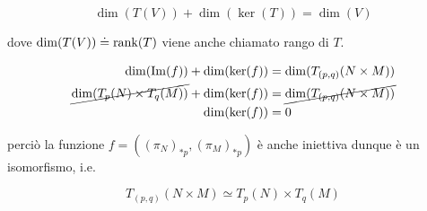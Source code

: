 {{	\begin{equation*}
		\dim(T(V)) + \dim(\ker(T)) = \dim(V)
	\end{equation*}
	
	dove $ \dim(T(V)) \doteq \rank(T) $ viene anche chiamato rango di $ T $.%
}

\begin{align}
	\begin{split}
		\dim(\Im(f)) + \dim(\ker(f)) &= \dim(T_{(p,q)}(N \times M)) \\
		\cancel{ \dim(T_{p}(N) \times T_{q}(M)) } + \dim(\ker(f)) &= \cancel{ \dim(T_{(p,q)}(N \times M)) } \\
		\dim(\ker(f)) &= 0
	\end{split}
\end{align}

perciò la funzione $ f = \left( (\pi_{N})_{*p},(\pi_{M})_{*p} \right) $ è anche iniettiva dunque è un isomorfismo, i.e.

\begin{equation}
	T_{(p,q)}(N \times M) \simeq T_{p}(N) \times T_{q}(M)
\end{equation}
}


